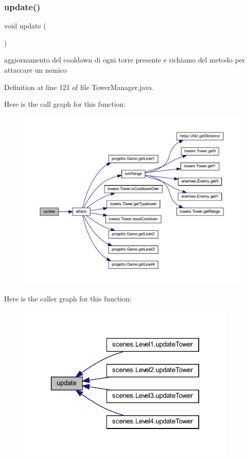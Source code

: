 \subsubsection{\texorpdfstring{update()}{update()}}
{\footnotesize\ttfamily void update (\begin{DoxyParamCaption}{ }\end{DoxyParamCaption})}



aggiornamento del cooldown di ogni torre presente e richiamo del metodo per attaccare un nemico 



Definition at line 121 of file Tower\+Manager.\+java.

Here is the call graph for this function\+:\nopagebreak
\begin{figure}[H]
\begin{center}
\leavevmode
\includegraphics[width=350pt]{classmanagers_1_1_tower_manager_ac5c54df7ed3b930268c8d7752c101725_cgraph}
\end{center}
\end{figure}
Here is the caller graph for this function\+:\nopagebreak
\begin{figure}[H]
\begin{center}
\leavevmode
\includegraphics[width=298pt]{classmanagers_1_1_tower_manager_ac5c54df7ed3b930268c8d7752c101725_icgraph}
\end{center}
\end{figure}
